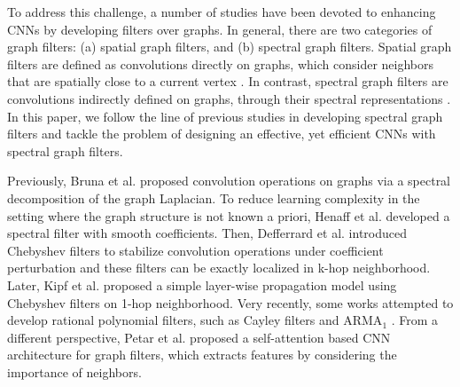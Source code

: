 \documentclass{article}
\begin{document}
To address this challenge, a number of studies have been devoted to enhancing CNNs by developing filters over graphs. In general, there are two categories of graph filters: (a) spatial graph filters, and (b) spectral graph filters. Spatial graph filters are defined as convolutions directly on graphs, which consider neighbors that are spatially close to a current vertex \cite{atwood2016diffusion, duvenaud2015convolutional, hamilton2017inductive}. In contrast, spectral graph filters are convolutions indirectly defined on graphs, through their spectral representations \cite{bruna2013spectral,chung1997spectral,defferrard2016convolutional}. In this paper, we follow the line of previous studies in developing spectral graph filters and tackle the problem of designing an effective, yet efficient CNNs with spectral graph filters.

Previously, Bruna et al. \cite{bruna2013spectral} proposed convolution operations on graphs via a spectral decomposition of the graph Laplacian. To reduce learning complexity in the setting where the graph structure is not known a priori, Henaff et al. \cite{henaff2015deep} developed a spectral filter with smooth coefficients. Then, Defferrard et al. \cite{defferrard2016convolutional} introduced Chebyshev filters to stabilize convolution operations under coefficient perturbation and these filters can be exactly localized in k-hop neighborhood. Later, Kipf et al. \cite{kipf2016semi} proposed a simple layer-wise propagation model using Chebyshev filters on 1-hop neighborhood. Very recently, some works attempted to develop rational polynomial filters, such as Cayley filters \cite{levie2017cayleynets} and ARMA$_1$ \cite{bianchi2019graph}. From a different perspective, Petar et al. \cite{velivckovic2017graph} proposed a self-attention based CNN architecture for  graph filters, which extracts features by considering the importance of neighbors. 
\end{document}
